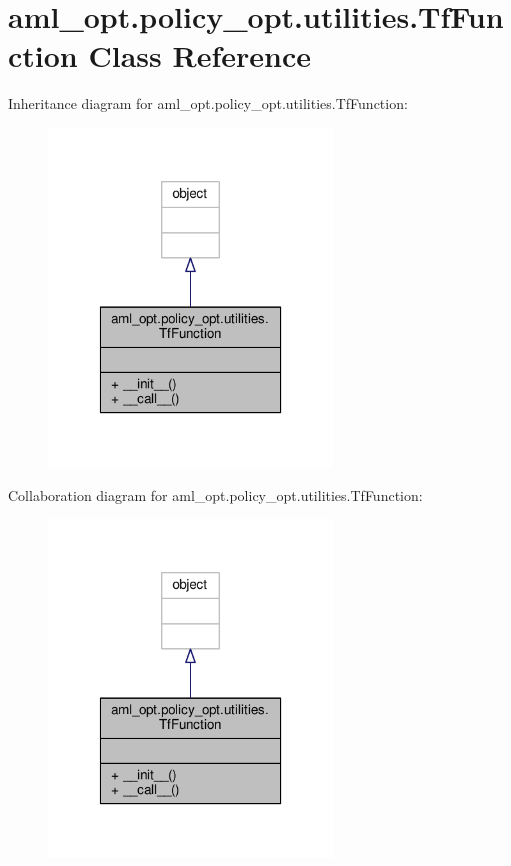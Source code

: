 \hypertarget{classaml__opt_1_1policy__opt_1_1utilities_1_1_tf_function}{\section{aml\-\_\-opt.\-policy\-\_\-opt.\-utilities.\-Tf\-Function Class Reference}
\label{classaml__opt_1_1policy__opt_1_1utilities_1_1_tf_function}
}


Inheritance diagram for aml\-\_\-opt.\-policy\-\_\-opt.\-utilities.\-Tf\-Function\-:
\nopagebreak
\begin{figure}[H]
\begin{center}
\leavevmode
\includegraphics[width=214pt]{classaml__opt_1_1policy__opt_1_1utilities_1_1_tf_function__inherit__graph}
\end{center}
\end{figure}


Collaboration diagram for aml\-\_\-opt.\-policy\-\_\-opt.\-utilities.\-Tf\-Function\-:
\nopagebreak
\begin{figure}[H]
\begin{center}
\leavevmode
\includegraphics[width=214pt]{classaml__opt_1_1policy__opt_1_1utilities_1_1_tf_function__coll__graph}
\end{center}
\end{figure}
